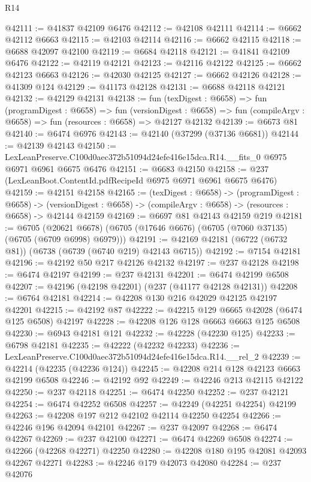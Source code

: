 \begin{lexlean}{R14}
\begin{coremodule}
@42111 := @41837 @42109 @6476
@42112 := @42108 @42111
@42114 := @6662 @42112 @6663
@42115 := @42103 @42114
@42116 := @6662 @42115
@42118 := @6688 @42097 @42100
@42119 := @6684 @42118
@42121 := @41841 @42109 @6476
@42122 := @42119 @42121
@42123 := @42116 @42122
@42125 := @6662 @42123 @6663
@42126 := @42030 @42125
@42127 := @6662 @42126
@42128 := @41309 @124
@42129 := @41173 @42128
@42131 := @6688 @42118 @42121
@42132 := @42129 @42131
@42138 := fun (texDigest : @6658) =>
  fun (programDigest : @6658) =>
  fun (versionDigest : @6658) =>
  fun (compileArgv : @6658) => fun (resources : @6658) => @42127 @42132
@42139 := @6673 @81
@42140 := @6474 @6976
@42143 := @42140 (@37299 (@37136 @6681))
@42144 := @42139 @42143
@42150 := LexLeanPreserve.C100d0aec372b51094d24efe416e15dca.R14.__fits_0
    @6975
    @6971
    @6961
    @6675
    @6476
@42151 := @6683 @42150
@42158 := @237 (LexLeanBoot.ContentId.pdfRecipeId @6975 @6971 @6961 @6675 @6476)
@42159 := @42151 @42158
@42165 := (texDigest : @6658) ->
  (programDigest : @6658) ->
  (versionDigest : @6658) -> (compileArgv : @6658) -> (resources : @6658) -> @42144 @42159
@42169 := @6697 @81 @42143 @42159 @219
@42181 := @6705
    (@20621 @6678)
    (@6705 (@17646 @6676) (@6705 (@7060 @37135) (@6705 (@6709 @6998) @6979)))
@42191 := @42169 @42181 (@6722 (@6732 @81)) (@6738 (@6739 (@6740 @219) @42143 @6715))
@42192 := @7154 @42181
@42196 := @42192 @50 @217 @42126 @42132
@42197 := @237 @42128
@42198 := @6474 @42197
@42199 := @237 @42131
@42201 := @6474 @42199 @6508
@42207 := @42196 (@42198 @42201) (@237 (@41177 @42128 @42131))
@42208 := @6764 @42181
@42214 := @42208 @130 @216 @42029 @42125 @42197 @42201
@42215 := @42192 @87
@42222 := @42215 @129 @6665 @42028 (@6474 @125 @6508) @42197
@42228 := @42208 @126 @128 @6663 @6663 @125 @6508
@42230 := @6943 @42181 @121
@42232 := @42228 (@42230 @125)
@42233 := @6798 @42181
@42235 := @42222 (@42232 @42233)
@42236 := LexLeanPreserve.C100d0aec372b51094d24efe416e15dca.R14.__rel_2
@42239 := @42214 (@42235 (@42236 @124))
@42245 := @42208 @214 @128 @42123 @6663 @42199 @6508
@42246 := @42192 @92
@42249 := @42246 @213 @42115 @42122
@42250 := @237 @42118
@42251 := @6474 @42250
@42252 := @237 @42121
@42254 := @6474 @42252 @6508
@42257 := @42249 (@42251 @42254) @42199
@42263 := @42208 @197 @212 @42102 @42114 @42250 @42254
@42266 := @42246 @196 @42094 @42101
@42267 := @237 @42097
@42268 := @6474 @42267
@42269 := @237 @42100
@42271 := @6474 @42269 @6508
@42274 := @42266 (@42268 @42271) @42250
@42280 := @42208 @180 @195 @42081 @42093 @42267 @42271
@42283 := @42246 @179 @42073 @42080
@42284 := @237 @42076

\end{coremodule}
\end{lexlean}
